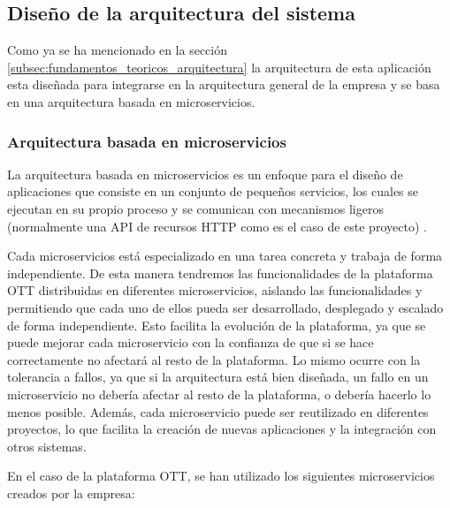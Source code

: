 \subsection{Diseño de la arquitectura del sistema}
\label{sec:diseno:ott:arquitectura}

Como ya se ha mencionado en la sección \ref{subsec:fundamentos_teoricos_arquitectura}
la arquitectura de esta aplicación esta diseñada para integrarse en la arquitectura general 
de la empresa y se basa en una arquitectura basada en microservicios. 

\subsubsection{Arquitectura basada en microservicios}
\label{subsec:diseno:ott:arquitectura_microservicios}

La arquitectura basada en microservicios es un enfoque para el diseño de aplicaciones que consiste en
un conjunto de pequeños servicios, los cuales se ejecutan en su propio proceso y se comunican con
mecanismos ligeros (normalmente una API de recursos HTTP como es el caso de este proyecto) \cite{Microservices}.

Cada microservicios está especializado en una tarea concreta y trabaja de forma independiente. De esta manera
tendremos las funcionalidades de la plataforma OTT distribuidas en diferentes microservicios, aislando las funcionalidades
y permitiendo que cada uno de ellos pueda ser desarrollado, desplegado y escalado de forma independiente. Esto facilita
la evolución de la plataforma, ya que se puede mejorar cada microservicio con la confianza de que si se hace correctamente
no afectará al resto de la plataforma. Lo mismo ocurre con la tolerancia a fallos, ya que si la arquitectura está bien
diseñada, un fallo en un microservicio no debería afectar al resto de la plataforma, o debería hacerlo lo menos posible.
Además, cada microservicio puede ser reutilizado en diferentes proyectos, lo que facilita la creación de nuevas aplicaciones
y la integración con otros sistemas.

En el caso de la plataforma OTT, se han utilizado los siguientes microservicios creados por la empresa:

